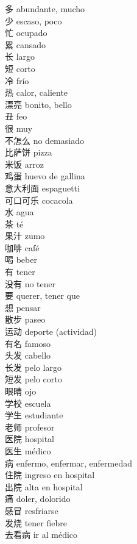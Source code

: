 \documentclass[13pt]{article}
\begin{document}
\begin{CJK*}{UTF8}{gkai}
\begin{multicols}{2}
\begin{pinyinscope}
多 \quad abundante, mucho\\
少 \quad escaso, poco\\
忙 \quad ocupado\\
累 \quad cansado\\
长 \quad largo\\
短 \quad corto\\
冷 \quad frío\\
热 \quad calor, caliente\\
漂亮 \quad bonito, bello\\
丑 \quad feo\\
很 \quad muy\\
不怎么 \quad no demasiado\\
比萨饼 \quad pizza\\
米饭 \quad arroz\\
鸡蛋 \quad huevo de gallina\\
意大利面 \quad espaguetti\\
可口可乐 \quad cocacola\\
水 \quad agua\\
茶 \quad té\\
果汁 \quad zumo\\
咖啡 \quad café\\
喝 \quad beber\\
有 \quad tener\\
没有 \quad no tener\\
要 \quad querer, tener que\\
想 \quad pensar\\
散步 \quad paseo\\
运动 \quad deporte (actividad)\\
有名 \quad famoso\\
头发 \quad cabello\\
长发 \quad pelo largo\\
短发 \quad pelo corto\\
眼睛 \quad ojo\\
学校 \quad escuela\\
学生 \quad estudiante\\
老师 \quad profesor\\
医院 \quad hospital\\
医生 \quad médico\\
病 \quad enfermo, enfermar, enfermedad\\
住院 \quad ingreso en hospital\\
出院 \quad alta en hospital\\
痛 \quad doler, dolorido\\
感冒 \quad resfriarse\\
发烧 \quad tener fiebre\\
去看病 \quad ir al médico\\

\end{pinyinscope}
\end{multicols}
\end{CJK*}
\end{document}
